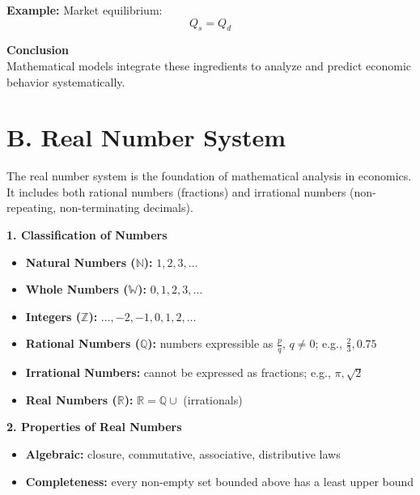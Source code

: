 \begin{tcolorbox}[examplebox]
\textbf{Example:} Market equilibrium:
\[
Q_s = Q_d
\]
\end{tcolorbox}

\begin{tcolorbox}[sectionbox]
\textbf{Conclusion}\\
Mathematical models integrate these ingredients to analyze and predict economic behavior systematically.
\end{tcolorbox}
\section*{B. Real Number System}

\begin{tcolorbox}[sectionbox]

The real number system is the foundation of mathematical analysis in economics. It includes both rational numbers (fractions) and irrational numbers (non-repeating, non-terminating decimals).
\end{tcolorbox}

\begin{tcolorbox}[sectionbox]
\textbf{1.  Classification of Numbers}
\begin{itemize}
    \item \textbf{Natural Numbers ($\mathbb{N}$):} $1,2,3,\dots$ 
    \item \textbf{Whole Numbers ($\mathbb{W}$):} $0,1,2,3,\dots$
    \item \textbf{Integers ($\mathbb{Z}$):} $\dots,-2,-1,0,1,2,\dots$
    \item \textbf{Rational Numbers ($\mathbb{Q}$):} numbers expressible as $\frac{p}{q}$, $q\neq0$; e.g., $\frac{2}{3},0.75$
    \item \textbf{Irrational Numbers:} cannot be expressed as fractions; e.g., $\pi,\sqrt{2}$
    \item \textbf{Real Numbers ($\mathbb{R}$):} $\mathbb{R} = \mathbb{Q} \cup$ (irrationals)
\end{itemize}
\end{tcolorbox}

\begin{tcolorbox}[sectionbox]
\textbf{2. Properties of Real Numbers}
\begin{itemize}
    \item \textbf{Algebraic:} closure, commutative, associative, distributive laws

    \item \textbf{Completeness:} every non-empty set bounded above has a least upper bound
\end{itemize}
\end{tcolorbox}

